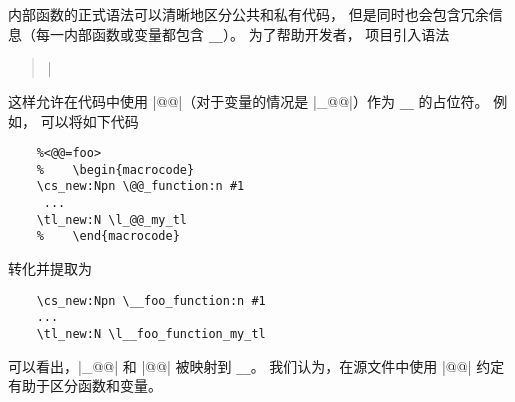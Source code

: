 \documentclass[full]{l3doc}
\begin{document}
%
内部函数的正式语法可以清晰地区分公共和私有代码，
但是同时也会包含冗余信息（每一内部函数或变量都包含 \texttt{__}）。
为了帮助开发者， 项目引入语法
\begin{quote}
    \ttfamily
    |%
\end{quote}
这样允许在代码中使用 |@@|（对于变量的情况是 |_@@|）作为 \texttt{__} 的占位符。
例如， 可以将如下代码
\begin{verbatim}
    %<@@=foo>
    %    \begin{macrocode}
    \cs_new:Npn \@@_function:n #1
     ...
    \tl_new:N \l_@@_my_tl
    %    \end{macrocode}
\end{verbatim}
转化并提取为
\begin{verbatim}
    \cs_new:Npn \__foo_function:n #1
    ...
    \tl_new:N \l__foo_function_my_tl
\end{verbatim}
可以看出，|_@@| 和 |@@| 被映射到 \texttt{__}。
我们认为，在源文件中使用 |@@| 约定有助于区分函数和变量。

%
\end{document}
